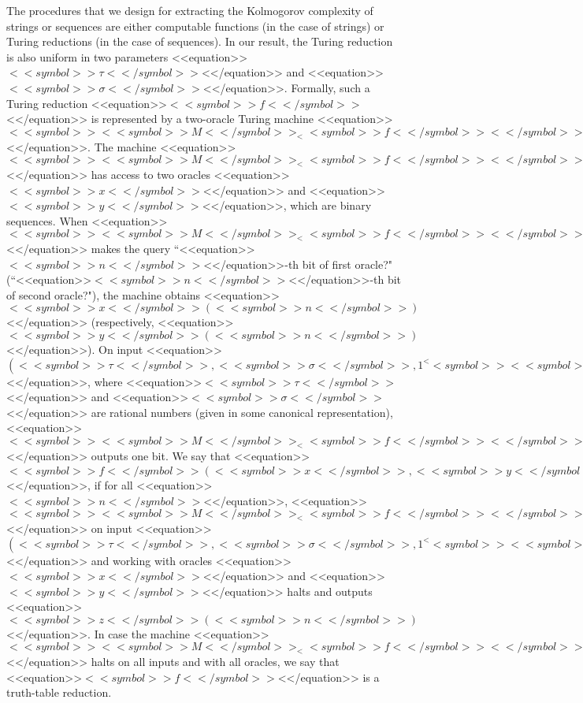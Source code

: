 \documentclass[proceedings]{stacs}
\begin{document}
The procedures that we design for extracting the Kolmogorov complexity of strings or sequences are either computable functions (in the case of strings) or Turing reductions (in the case of sequences). In our result,  the Turing reduction is also uniform in two parameters <<equation>>$<<symbol>>\tau<</symbol>>$<</equation>> and <<equation>>$<<symbol>>\sigma<</symbol>>$<</equation>>. Formally, such a Turing reduction   <<equation>>$<<symbol>>f<</symbol>>$<</equation>> is represented by a two-oracle Turing machine <<equation>>$<<symbol>><<symbol>>M<</symbol>>_<<symbol>>f<</symbol>><</symbol>>$<</equation>>. The machine <<equation>>$<<symbol>><<symbol>>M<</symbol>>_<<symbol>>f<</symbol>><</symbol>>$<</equation>> has access to two oracles <<equation>>$<<symbol>>x<</symbol>>$<</equation>> and <<equation>>$<<symbol>>y<</symbol>>$<</equation>>, which are binary sequences. When <<equation>>$<<symbol>><<symbol>>M<</symbol>>_<<symbol>>f<</symbol>><</symbol>>$<</equation>> makes the query ``<<equation>>$<<symbol>>n<</symbol>>$<</equation>>-th bit of first oracle?" (``<<equation>>$<<symbol>>n<</symbol>>$<</equation>>-th bit of second oracle?"), the machine obtains <<equation>>$<<symbol>>x<</symbol>>(<<symbol>>n<</symbol>>)$<</equation>> (respectively, <<equation>>$<<symbol>>y<</symbol>>(<<symbol>>n<</symbol>>)$<</equation>>). On input <<equation>>$(<<symbol>>\tau<</symbol>>, <<symbol>>\sigma<</symbol>>, 1^<<symbol>><<symbol>>n<</symbol>><</symbol>>)$<</equation>>, where <<equation>>$<<symbol>>\tau<</symbol>>$<</equation>> and <<equation>>$<<symbol>>\sigma<</symbol>>$<</equation>> are  rational numbers  (given in some canonical representation), <<equation>>$<<symbol>><<symbol>>M<</symbol>>_<<symbol>>f<</symbol>><</symbol>>$<</equation>> outputs one bit. We say that <<equation>>$<<symbol>>f<</symbol>>(<<symbol>>x<</symbol>>,<<symbol>>y<</symbol>>, <<symbol>>\tau<</symbol>>, <<symbol>>\sigma<</symbol>>,) = <<symbol>>z<</symbol>> \in \{0,1\}^<<symbol>><<symbol>>\infty<</symbol>><</symbol>>$<</equation>>, if for all <<equation>>$<<symbol>>n<</symbol>>$<</equation>>,  <<equation>>$<<symbol>><<symbol>>M<</symbol>>_<<symbol>>f<</symbol>><</symbol>>$<</equation>> on input <<equation>>$(<<symbol>>\tau<</symbol>>,<<symbol>>\sigma<</symbol>>, 1^<<symbol>><<symbol>>n<</symbol>><</symbol>>)$<</equation>> and working with oracles <<equation>>$<<symbol>>x<</symbol>>$<</equation>> and <<equation>>$<<symbol>>y<</symbol>>$<</equation>> halts and outputs <<equation>>$<<symbol>>z<</symbol>>(<<symbol>>n<</symbol>>)$<</equation>>.  
In case the machine <<equation>>$<<symbol>><<symbol>>M<</symbol>>_<<symbol>>f<</symbol>><</symbol>>$<</equation>> halts on all inputs and with all oracles, we say that <<equation>>$<<symbol>>f<</symbol>>$<</equation>> is a truth-table reduction.
\end{document}
